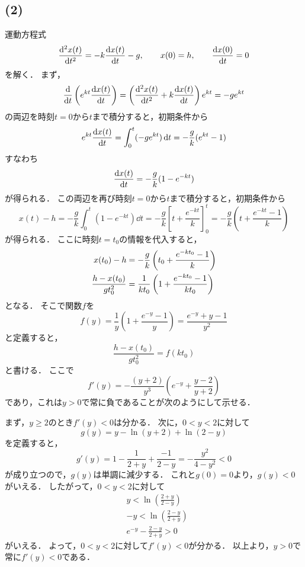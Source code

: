 \documentclass[a4paper,11pt]{jsarticle}
\begin{document}
\subsection*{(2)}
運動方程式
\begin{equation}
  \dv[2]{x(t)}{t} = -k\dv{x(t)}{t} - g,\qquad x(0)=h,\qquad \dv{x(0)}{t}=0
\end{equation}
を解く．
まず，
\begin{equation}
  \dv{}{t} \left(e^{kt}\dv{x(t)}{t}\right) = \left(\dv[2]{x(t)}{t}+k\dv{x(t)}{t}\right)e^{kt} = -ge^{kt}
\end{equation}
の両辺を時刻$t=0$から$t$まで積分すると，初期条件から
\begin{equation}
  e^{kt}\dv{x(t)}{t} = \int_0^t (-ge^{kt})\dd{t} = -\frac{g}{k}(e^{kt}-1)
\end{equation}
すなわち
\begin{equation}
  \dv{x(t)}{t} = -\frac{g}{k}(1-e^{-kt})
\end{equation}
が得られる．
この両辺を再び時刻$t=0$から$t$まで積分すると，初期条件から
\begin{equation}
  x(t) - h = - \frac{g}{k}\int_0^t (1-e^{-kt})\dd{t} = - \frac{g}{k} \left[t+\frac{e^{-kt}}{k}\right]_{0}^{t} = - \frac{g}{k} \left(t+\frac{e^{-kt}-1}{k}\right)
\end{equation}
が得られる．
ここに時刻$t=t_0$の情報を代入すると，
\begin{align}
  x(t_0) - h &= - \frac{g}{k} \left(t_0+\frac{e^{-kt_0}-1}{k}\right) \notag \\
  \frac{h-x(t_0)}{gt_0^2} &= \frac{1}{kt_0}\left(1+\frac{e^{-kt_0}-1}{kt_0}\right)
\end{align}
となる．
そこで関数$f$を
\begin{equation}
  f(y) = \frac{1}{y}\left(1+\frac{e^{-y}-1}{y}\right) = \frac{e^{-y}+y-1}{y^2} \label{f}
\end{equation}
と定義すると，
\begin{equation}
  \frac{h-x(t_0)}{gt_0^2} = f(kt_0)
\end{equation}
と書ける．
ここで
\begin{equation}
  f'(y) = -\frac{(y+2)}{y^3}\left(e^{-y}+\frac{y-2}{y+2}\right)
\end{equation}
であり，これは$y>0$で常に負であることが次のようにして示せる．

まず，$y\ge 2$のとき$f'(y)<0$は分かる．
次に，$0<y<2$に対して
\begin{equation}
  g(y) = y - \ln{(y+2)} + \ln{(2-y)}
\end{equation}
を定義すると，
\begin{equation}
  g'(y) = 1 - \frac{1}{2+y} + \frac{-1}{2-y} = -\frac{y^2}{4-y^2} < 0
\end{equation}
が成り立つので，$g(y)$は単調に減少する．
これと$g(0)=0$より，$g(y)<0$がいえる．
したがって，$0<y<2$に対して
\begin{align}
  &y < \ln{\left(\frac{2+y}{2-y}\right)} \\
  &-y < \ln{\left(\frac{2-y}{2+y}\right)} \\
  &e^{-y} - \frac{2-y}{2+y} > 0
\end{align}
がいえる．
よって，$0<y<2$に対して$f'(y)<0$が分かる．
以上より，$y>0$で常に$f'(y)<0$である．
\end{document}
